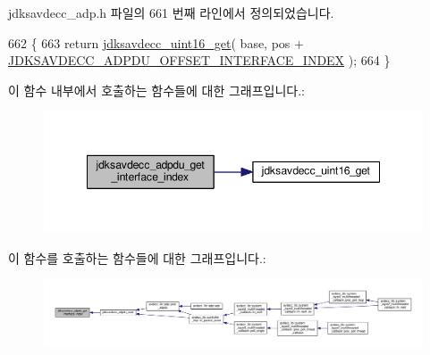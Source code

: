 jdksavdecc\+\_\+adp.\+h 파일의 661 번째 라인에서 정의되었습니다.


\begin{DoxyCode}
662 \{
663     \textcolor{keywordflow}{return} \hyperlink{group__endian_ga3fbbbc20be954aa61e039872965b0dc9}{jdksavdecc\_uint16\_get}( base, pos + 
      \hyperlink{group__adpdu_gaea82d7dfa4a13a7db9b97a3f906bb77b}{JDKSAVDECC\_ADPDU\_OFFSET\_INTERFACE\_INDEX} );
664 \}
\end{DoxyCode}


이 함수 내부에서 호출하는 함수들에 대한 그래프입니다.\+:
\nopagebreak
\begin{figure}[H]
\begin{center}
\leavevmode
\includegraphics[width=348pt]{group__adpdu_gac8a8b6bfc95370b68dfd1f5bfd335ae2_cgraph}
\end{center}
\end{figure}




이 함수를 호출하는 함수들에 대한 그래프입니다.\+:
\nopagebreak
\begin{figure}[H]
\begin{center}
\leavevmode
\includegraphics[width=350pt]{group__adpdu_gac8a8b6bfc95370b68dfd1f5bfd335ae2_icgraph}
\end{center}
\end{figure}



